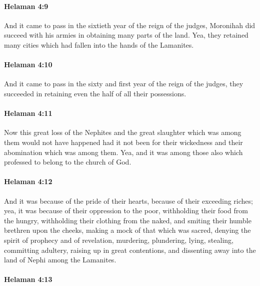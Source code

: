 		\paragraph{Helaman 4:9} %
			\label{HELAMAN-4-9}

			And it came to pass in the sixtieth year of the reign of the judges,
			Moronihah did succeed with his armies in obtaining many parts of the land.
			Yea, they retained many cities which had fallen into the hands of the Lamanites.

		\paragraph{Helaman 4:10} %
			\label{HELAMAN-4-10}

			And it came to pass in the sixty and first year of the reign of the judges,
			they succeeded in retaining even the half of all their possessions.

		\paragraph{Helaman 4:11} %
			\label{HELAMAN-4-11}

			Now this great loss of the Nephites
			and the great slaughter which was among them
			would not have happened
			had it not been for their wickedness
			and their abomination which was among them.
			Yea, and it was among those also which professed to belong to the church of God.

		\paragraph{Helaman 4:12} %
			\label{HELAMAN-4-12}

			And it was because of the pride of their hearts,
			because of their exceeding riches;
			yea, it was because of their oppression to the poor,
			withholding their food from the hungry,
			withholding their clothing from the naked,
			and smiting their humble brethren upon the cheeks,
			making a mock of that which was sacred,
			denying the spirit of prophecy and of revelation,
			murdering, plundering, lying, stealing, committing adultery,
			raising up in great contentions,
			and dissenting away into the land of Nephi among the Lamanites.

		\paragraph{Helaman 4:13} %
			\label{HELAMAN-4-13}

